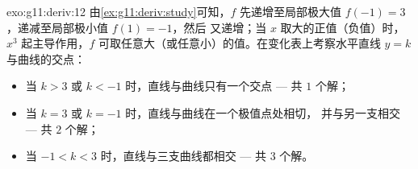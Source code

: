 \begin{solution}{exo:g11:deriv:12}
由\cref{ex:g11:deriv:study}可知，$f$ 先递增至局部极大值
$f(-1) = 3$，递减至局部极小值 $f(1) = -1$，然后
又递增；当 $x$ 取大的正值（负值）时，$x^3$ 起主导作用，$f$
可取任意大（或任意小）的值。在变化表上考察水平直线
$y = k$ 与曲线的交点：
\begin{itemize}
  \item 当 $k > 3$ 或 $k < -1$ 时，直线与曲线只有一个交点
        --- 共 $1$ 个解；
  \item 当 $k = 3$ 或 $k = -1$ 时，直线与曲线在一个极值点处相切，
        并与另一支相交 --- 共 $2$ 个解；
  \item 当 $-1 < k < 3$ 时，直线与三支曲线都相交 --- 共 $3$
        个解。
\end{itemize}
\end{solution}

